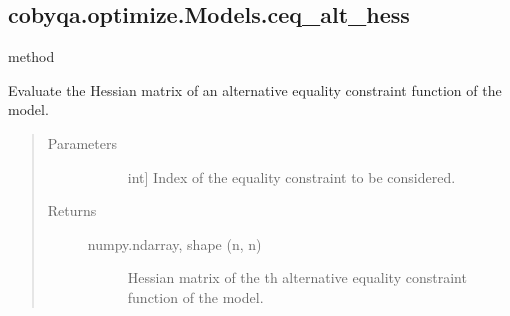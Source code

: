 \documentclass[letterpaper,10pt,english]{sphinxmanual}
\begin{document}
\begin{fulllineitems}
\begin{fulllineitems}
\begin{quote}
\begin{description}
\begin{description}
\end{description}

\end{description}\end{quote}

\end{fulllineitems}



\subsection{cobyqa.optimize.Models.ceq\_alt\_hess}
\label{\detokenize{refs/generated/cobyqa.optimize.Models.ceq_alt_hess:cobyqa-optimize-models-ceq-alt-hess}}\label{\detokenize{refs/generated/cobyqa.optimize.Models.ceq_alt_hess::doc}}
\sphinxAtStartPar
method

\begin{fulllineitems}
\label{\detokenize{refs/generated/cobyqa.optimize.Models.ceq_alt_hess:cobyqa.optimize.Models.ceq_alt_hess}}
\sphinxAtStartPar
Evaluate the Hessian matrix of an alternative equality constraint
function of the model.
\begin{quote}\begin{description}
\item[{Parameters}] \leavevmode\begin{description}
\item[{}] \leavevmode{[}int{]}
\sphinxAtStartPar
Index of the equality constraint to be considered.

\end{description}

\item[{Returns}] \leavevmode\begin{description}
\item[{numpy.ndarray, shape (n, n)}] \leavevmode
\sphinxAtStartPar
Hessian matrix of the \sphinxhyphen{}th alternative equality constraint
function of the model.

\end{description}

\end{description}\end{quote}

\end{fulllineitems}




\end{fulllineitems}
\end{document}

